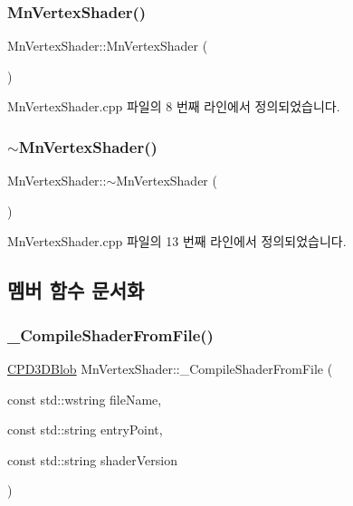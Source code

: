 \subsubsection{\texorpdfstring{Mn\+Vertex\+Shader()}{MnVertexShader()}}
{\footnotesize\ttfamily Mn\+Vertex\+Shader\+::\+Mn\+Vertex\+Shader (\begin{DoxyParamCaption}{ }\end{DoxyParamCaption})}



Mn\+Vertex\+Shader.\+cpp 파일의 8 번째 라인에서 정의되었습니다.

\mbox{\label{class_m_n_l_1_1_mn_vertex_shader_a4077f03af7d311e898b391a27e0c6e0c}} 
\subsubsection{\texorpdfstring{$\sim$\+Mn\+Vertex\+Shader()}{~MnVertexShader()}}
{\footnotesize\ttfamily Mn\+Vertex\+Shader\+::$\sim$\+Mn\+Vertex\+Shader (\begin{DoxyParamCaption}{ }\end{DoxyParamCaption})}



Mn\+Vertex\+Shader.\+cpp 파일의 13 번째 라인에서 정의되었습니다.



\subsection{멤버 함수 문서화}
\mbox{\label{class_m_n_l_1_1_mn_vertex_shader_aa97b2e9590a449c6be9871fa856e8d95}} 
\subsubsection{\texorpdfstring{\+\_\+\+Compile\+Shader\+From\+File()}{\_CompileShaderFromFile()}}
{\footnotesize\ttfamily \hyperlink{namespace_m_n_l_a3716e3bee60c31fe1b7b5dd5a82db59a}{C\+P\+D3\+D\+Blob} Mn\+Vertex\+Shader\+::\+\_\+\+Compile\+Shader\+From\+File (\begin{DoxyParamCaption}\item[{const std\+::wstring}]{file\+Name,  }\item[{const std\+::string}]{entry\+Point,  }\item[{const std\+::string}]{shader\+Version }\end{DoxyParamCaption})\hspace{0.3cm}{\ttfamily [private]}}



